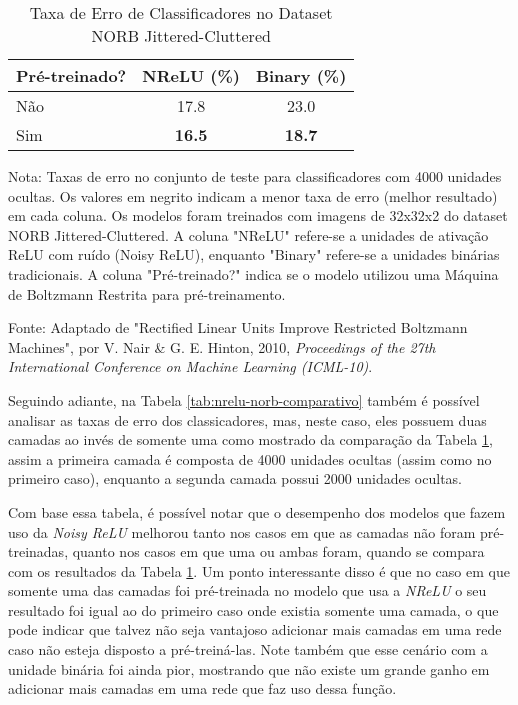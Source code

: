 \begin{table}[ht]
    \centering
    \begin{threeparttable}
        \caption{Taxa de Erro de Classificadores no Dataset NORB Jittered-Cluttered}
        \label{tab:norb-error-rate}
        \begin{tabular}{lcc}
            \toprule
            \textbf{Pré-treinado?} & \textbf{NReLU (\%)} & \textbf{Binary (\%)} \\
            \midrule
            
            Não & 17.8 & 23.0 \\
            Sim & \textbf{16.5} & \textbf{18.7} \\
            
            \bottomrule
        \end{tabular}
        
        \begin{tablenotes}[para]
            \small
            \item[] Nota: Taxas de erro no conjunto de teste para classificadores com 4000 unidades ocultas. Os valores em negrito indicam a menor taxa de erro (melhor resultado) em cada coluna. Os modelos foram treinados com imagens de 32x32x2 do dataset NORB Jittered-Cluttered. A coluna "NReLU" refere-se a unidades de ativação ReLU com ruído (Noisy ReLU), enquanto "Binary" refere-se a unidades binárias tradicionais. A coluna "Pré-treinado?" indica se o modelo utilizou uma Máquina de Boltzmann Restrita para pré-treinamento.
            \item[] Fonte: Adaptado de "Rectified Linear Units Improve Restricted Boltzmann Machines", por V. Nair \& G. E. Hinton, 2010, \textit{Proceedings of the 27th International Conference on Machine Learning (ICML-10)}.
        \end{tablenotes}
        
    \end{threeparttable}
\end{table}

Seguindo adiante, na Tabela \ref{tab:nrelu-norb-comparativo} também é possível analisar as taxas de erro dos classicadores, mas, neste caso, eles possuem duas camadas ao invés de somente uma como mostrado da comparação da Tabela \ref{tab:norb-error-rate}, assim a primeira camada é composta de 4000 unidades ocultas (assim como no primeiro caso), enquanto a segunda camada possui 2000 unidades ocultas. 

Com base essa tabela, é possível notar que o desempenho dos modelos que fazem uso da \textit{Noisy ReLU} melhorou tanto nos casos em que as camadas não foram pré-treinadas, quanto nos casos em que uma ou ambas foram, quando se compara com os resultados da Tabela \ref{tab:norb-error-rate}. Um ponto interessante disso é que no caso em que somente uma das camadas foi pré-treinada no modelo que usa a \textit{NReLU} o seu resultado foi igual ao do primeiro caso onde existia somente uma camada, o que pode indicar que talvez não seja vantajoso adicionar mais camadas em uma rede caso não esteja disposto a pré-treiná-las. Note também que esse cenário com a unidade binária foi ainda pior, mostrando que não existe um grande ganho em adicionar mais camadas em uma rede que faz uso dessa função.

